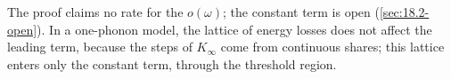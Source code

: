 The proof claims no rate for the $o(\omega)$; the constant term is open (\cref{sec:18.2-open}). In a one-phonon model, the lattice of energy losses does not affect the leading term, because the steps of $K_\infty$ come from continuous shares; this lattice enters only the constant term, through the threshold region.
